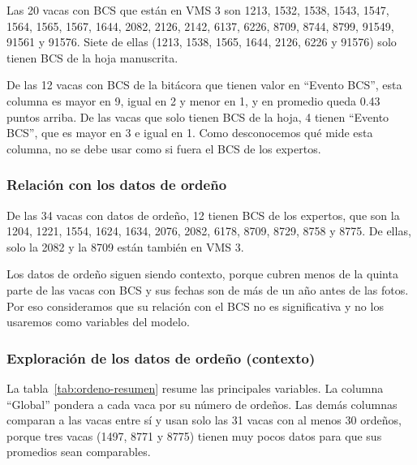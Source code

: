 Las 20 vacas con BCS que están en VMS 3 son 1213, 1532, 1538, 1543, 1547, 1564, 1565, 1567, 1644, 2082, 2126, 2142, 6137, 6226, 8709, 8744, 8799, 91549, 91561 y 91576. Siete de ellas (1213, 1538, 1565, 1644, 2126, 6226 y 91576) solo tienen BCS de la hoja manuscrita.

De las 12 vacas con BCS de la bitácora que tienen valor en ``Evento BCS'', esta columna es mayor en 9, igual en 2 y menor en 1, y en promedio queda 0.43 puntos arriba. De las vacas que solo tienen BCS de la hoja, 4 tienen ``Evento BCS'', que es mayor en 3 e igual en 1. Como desconocemos qué mide esta columna, no se debe usar como si fuera el BCS de los expertos.

\subsubsection*{Relación con los datos de ordeño}

De las 34 vacas con datos de ordeño, 12 tienen BCS de los expertos, que son la 1204, 1221, 1554, 1624, 1634, 2076, 2082, 6178, 8709, 8729, 8758 y 8775. De ellas, solo la 2082 y la 8709 están también en VMS 3.

Los datos de ordeño siguen siendo contexto, porque cubren menos de la quinta parte de las vacas con BCS y sus fechas son de más de un año antes de las fotos. Por eso consideramos que su relación con el BCS no es significativa y no los usaremos como variables del modelo.

\subsubsection*{Exploración de los datos de ordeño (contexto)}

La tabla~\ref{tab:ordeno-resumen} resume las principales variables. La columna ``Global'' pondera a cada vaca por su número de ordeños. Las demás columnas comparan a las vacas entre sí y usan solo las 31 vacas con al menos 30 ordeños, porque tres vacas (1497, 8771 y 8775) tienen muy pocos datos para que sus promedios sean comparables.

